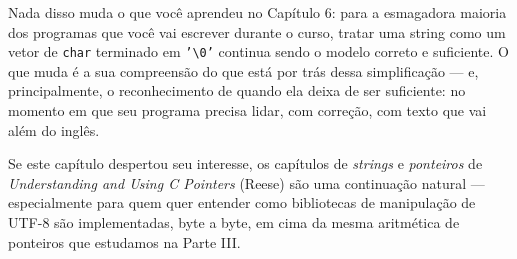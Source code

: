 Nada disso muda o que você aprendeu no Capítulo 6: para a esmagadora maioria dos programas que você vai escrever durante o curso, tratar uma string como um vetor de \texttt{char} terminado em \texttt{'\textbackslash 0'} continua sendo o modelo correto e suficiente. O que muda é a sua compreensão do que está por trás dessa simplificação — e, principalmente, o reconhecimento de quando ela deixa de ser suficiente: no momento em que seu programa precisa lidar, com correção, com texto que vai além do inglês.

Se este capítulo despertou seu interesse, os capítulos de \textit{strings} e \textit{ponteiros} de \textit{Understanding and Using C Pointers} (Reese) são uma continuação natural — especialmente para quem quer entender como bibliotecas de manipulação de UTF-8 são implementadas, byte a byte, em cima da mesma aritmética de ponteiros que estudamos na Parte III.



